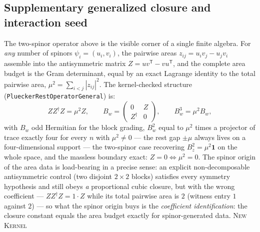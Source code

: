 \documentclass[11pt]{article}
\newcommand{\Kernel}{\textcolor{kernelcolor}{\textsc{Kernel}}}
\newcommand{\NewResult}{\textsc{New}}
\newcommand{\id}{\mathbf{1}}
\begin{document}
\subsection{Supplementary generalized closure and interaction seed}
\label{sec:cubiclosure}

The two-spinor operator above is the visible corner of a single finite
algebra.  For \emph{any} number of spinors $\psi_i=(u_i,v_i)$, the
pairwise areas $z_{ij}=u_iv_j-u_jv_i$ assemble into the antisymmetric
matrix $Z=uv^{\mathsf T}-vu^{\mathsf T}$, and the complete area budget
is the Gram determinant, equal by an exact Lagrange identity to the
total pairwise area, $\mu^2=\sum_{i<j}|z_{ij}|^2$.  The kernel-checked
structure (\texttt{PlueckerRestOperatorGeneral}) is:
\begin{equation}\label{eq:cubiclosure}
  ZZ^\dagger Z=\mu^2 Z,
  \qquad
  B_w=\begin{pmatrix}0&Z\\ Z^\dagger&0\end{pmatrix},
  \qquad
  B_w^3=\mu^2 B_w,
\end{equation}
with $B_w$ odd Hermitian for the block grading, $B_w^2$ equal to
$\mu^2$ times a projector of trace exactly four for every $n$ with
$\mu^2\neq0$ --- the rest gap $\pm\mu$ always lives on a four-dimensional
support --- the two-spinor case recovering $B_z^2=\mu^2\id$ on the whole
space, and the massless boundary exact: $Z=0\iff\mu^2=0$.  The spinor
origin of the area data is load-bearing in a precise sense: an explicit
non-decomposable antisymmetric control (two disjoint $2\times2$ blocks)
satisfies every symmetry hypothesis and still obeys \emph{a}
proportional cubic closure, but with the wrong coefficient --- $ZZ^\dagger
Z=1\cdot Z$ while its total pairwise area is $2$ (witness entry $1$
against $2$) --- so what the spinor origin buys is the
\emph{coefficient identification}: the closure constant equals the area
budget exactly for spinor-generated data.  \NewResult{} \Kernel{}
\end{document}

